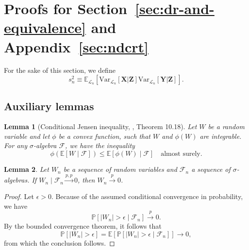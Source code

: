 \documentclass[aos]{imsart}
\newtheorem{lemma}{Lemma}
\theoremstyle{definition}
\theoremstyle{remark}
\newcommand{\E}{\mathbb E}								%
\newcommand{\V}{\mathrm{Var}}							%
\renewcommand{\P}{\mathbb{P}}							%
\newcommand{\convp}{\overset p \rightarrow}             %
\newcommand{\prx}{\bm X}								%
\newcommand{\prz}{\bm Z}								%
\newcommand{\pry}{{\bm Y}}								%
\newcommand{\law}{\mathcal L}							%
\newcommand{\convpp}{\overset {p,p} \longrightarrow}    %
\begin{document}
\section{Proofs for Section~\ref{sec:dr-and-equivalence} and Appendix~\ref{sec:ndcrt}}

For the sake of this section, we define
\begin{equation}
	s^2_n \equiv \E_{\law_n}[\V_{\law_n}[\prx|\prz]\V_{\law_n}[\pry|\prz]]. 
\end{equation}

\subsection{Auxiliary lemmas}

\begin{lemma}[Conditional Jensen inequality, \cite{Davidson2003}, Theorem 10.18] \label{lem:conditional-jensen}
	Let $W$ be a random variable and let $\phi$ be a convex function, such that $W$ and $\phi(W)$ are integrable. For any $\sigma$-algebra $\mathcal F$, we have the inequality
	\begin{equation*}
		\phi(\E[W \mid \mathcal F]) \leq  \E[\phi(W) \mid \mathcal F] \quad \text{almost surely}.
	\end{equation*}
\end{lemma}

\begin{lemma} \label{lem:conditional-convergence-to-unconditional}
	Let $W_n$ be a sequence of random variables and $\mathcal F_n$ a sequence of $\sigma$-algebras. If $W_n \mid \mathcal F_n \convpp 0$, then $W_n \convp 0$. 
\end{lemma}

\begin{proof}
	Let $\epsilon > 0$. Because of the assumed conditional convergence in probability, we have
	\begin{equation*}
		\P[|W_n| > \epsilon \mid \mathcal F_n] \convp 0.
	\end{equation*}
	By the bounded convergence theorem, it follows that
	\begin{equation*}
		\P[|W_n| > \epsilon] = \E[\P[|W_n| > \epsilon \mid \mathcal F_n]] \rightarrow 0,
	\end{equation*}
	from which the conclusion follows.
\end{proof}
\end{document}
